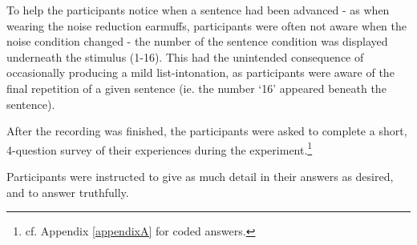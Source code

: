 To help the participants notice when a sentence had been advanced - as when wearing the noise reduction earmuffs, participants were often not aware when the noise condition changed - the number of the sentence condition was displayed underneath the stimulus (1-16).  This had the unintended consequence of occasionally producing a mild list-intonation, as participants were aware of the final repetition of a given sentence (ie. the number `16' appeared beneath the sentence). 

After the recording was finished, the participants were asked to complete a short, 4-question survey of their experiences during the experiment.\footnote{cf. Appendix \ref{appendixA} for coded answers.}  
\DIFdelbegin {}%

\DIFdelend %
Participants were instructed to give as much detail in their answers as desired, and to answer truthfully.  
\DIFdelbegin {}\DIFdelend %

